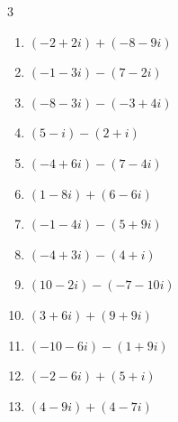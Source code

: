 \begin{multicols}{3}
\begin{enumerate}
        \phantom{$\displaystyle =-5+2i$}

  \item $\displaystyle (-2+2i) + (-8-9i)$

        \phantom{$\displaystyle =-10-7i$}

  \item $\displaystyle (-1-3i) - (7-2i)$

        \phantom{$\displaystyle =-8-i$}

  \item $\displaystyle (-8-3i) - (-3+4i)$

        \phantom{$\displaystyle =-5-7i$}

  \item $\displaystyle (5-i) - (2+i)$

        \phantom{$\displaystyle =3-2i$}

  \item $\displaystyle (-4+6i) - (7-4i)$

        \phantom{$\displaystyle =-11+10i$}

  \item $\displaystyle (1-8i) + (6-6i)$

        \phantom{$\displaystyle =7-14i$}

  \item $\displaystyle (-1-4i) - (5+9i)$

        \phantom{$\displaystyle =-6-13i$}

  \item $\displaystyle (-4+3i) - (4+i)$

        \phantom{$\displaystyle =-8+2i$}

  \item $\displaystyle (10-2i) - (-7-10i)$

        \phantom{$\displaystyle =17+8i$}

  \item $\displaystyle (3+6i) + (9+9i)$

        \phantom{$\displaystyle =12+15i$}

\columnbreak %

  \item $\displaystyle (-10-6i) - (1+9i)$

        \phantom{$\displaystyle =-11-15i$}

  \item $\displaystyle (-2-6i) + (5+i)$

        \phantom{$\displaystyle =3-5i$}

  \item $\displaystyle (4-9i) + (4-7i)$


\end{enumerate}
\end{multicols}
